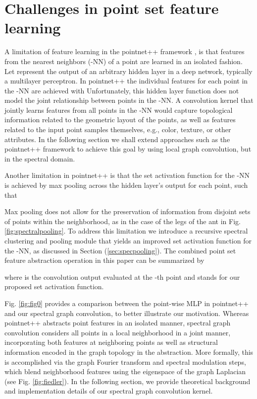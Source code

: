 \documentclass[runningheads]{llncs}
\begin{document}
\section{Challenges in point set feature learning}\label{sec:limPointnet}
A limitation of feature learning in the pointnet++ framework \cite{qi2017pointnet}, is that features from the  nearest neighbors (-NN) of a point are learned in an isolated fashion. Let  represent the output of an arbitrary hidden layer in a deep network, typically a multilayer perceptron. In pointnet++ the individual features for each point in the -NN are achieved with  Unfortunately, this hidden layer function does not model the joint relationship between points in the -NN. A convolution kernel that jointly learns features from all points in the -NN would capture topological information related to the geometric layout of the points, as well as features related to the input point samples themselves, e.g., color, texture, or other attributes. In the following section we shall extend approaches such as the pointnet++ framework to achieve this goal by using local graph convolution, but in the spectral domain. 

Another limitation in pointnet++ is that the set activation function for the -NN is achieved by max pooling across the hidden layer's output for each point, such that

Max pooling does not allow for the preservation of information from disjoint sets of points within the neighborhood, as in the case of the legs of the ant in Fig. \ref{fig:spectralpooling}.
To address this limitation we introduce a recursive spectral clustering and pooling module that yields an improved set activation function for the -NN, as discussed in Section (\ref{sec:specpooling}). The combined point set feature abstraction operation in this paper can be summarized by

where  is the convolution output  evaluated at the -th point and  stands for our proposed set activation function. 

Fig. \ref{fig:fig0} provides a comparison between the point-wise MLP in pointnet++ \cite{qi2017pointnet} and our spectral graph convolution, to better illustrate our motivation. Whereas pointnet++ abstracts point features in an isolated manner, spectral graph convolution considers all points in a local neighborhood in a joint manner, incorporating both features at neighboring points as well as structural information encoded in the graph topology in the abstraction. More formally, this is accomplished via the graph Fourier transform and spectral modulation steps, which blend neighborhood features using the eigenspace of the graph Laplacian (see Fig. \ref{fig:fiedler}). 
In the following section, we provide theoretical background and implementation details of our spectral graph convolution kernel.
\end{document}
